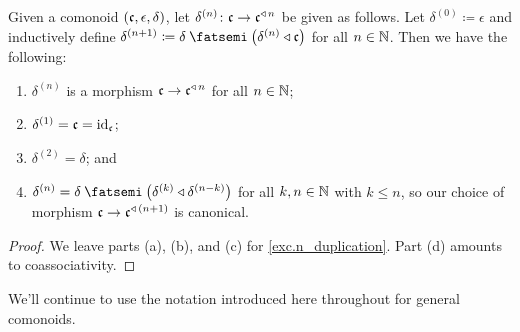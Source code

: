 \documentclass[Book-Poly]{subfiles}
\begin{document}
\begin{proposition} \label{prop.n_duplication}
Given a comonoid $(\mathfrak{c},\epsilon,\delta)$, let $\delta^{(n)}\colon\mathfrak{c}\to\mathfrak{c}^{\mathbin{\triangleleft}\,n}$ be given as follows. Let $\delta^{(0)}\coloneqq\epsilon$ and inductively define $\delta^{(n+1)}\coloneqq\delta\then\left(\delta^{(n)}\tri\car{c}\right)$ for all $n\in\mathbb{N}$.
Then we have the following:
\begin{enumerate}[label=(\alph*)]
    \item $\delta^{(n)}$ is a morphism $\mathfrak{c}\to\mathfrak{c}^{\mathbin{\triangleleft}\,n}$ for all $n\in\mathbb{N}$;
    \item $\delta^{(1)}=\mathfrak{c}=\mathrm{id}_{\mathfrak{c}}$;
    \item $\delta^{(2)}=\delta$; and
    \item $\delta^{(n)}=\delta\then\left(\delta^{(k)}\tri\delta^{(n-k)}\right)$ for all $k,n\in\mathbb{N}$ with $k\leq n$, so our choice of morphism $\mathfrak{c}\to\mathfrak{c}^{\mathbin{\triangleleft}\,(n+1)}$ is canonical. %
\end{enumerate}
\end{proposition}
 \begin{proof}
 We leave parts (a), (b), and (c) for \cref{exc.n_duplication}. Part (d) amounts to coassociativity.
\end{proof}

We'll continue to use the notation introduced here throughout for general comonoids.
\end{document}

